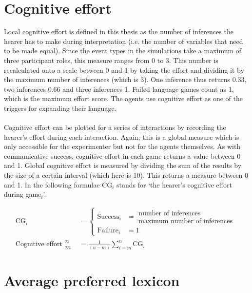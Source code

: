 \section*{Cognitive effort}

 Local cognitive effort is defined in this thesis as the number of inferences the hearer has to make during interpretation (i.e. the number of variables that need to be made equal). Since the event types in the simulations take a maximum of three participant roles, this measure ranges from 0 to 3. This number is recalculated onto a scale between 0 and 1 by taking the effort and dividing it by the maximum number of inferences (which is 3). One inference thus returns 0.33, two inferences 0.66 and three inferences 1. Failed language games count as 1, which is the maximum effort score. The agents use cognitive effort as one of the triggers for expanding their language.
\\
\\
 Cognitive effort can be plotted for a series of interactions by recording the hearer's effort during each interaction. Again, this is a global measure which is only accessible for the experimenter but not for the agents themselves. As with communicative success, cognitive effort in each game returns a value between 0 and 1. Global cognitive effort is measured by dividing the sum of the results by the size of a certain interval (which here is 10). This returns a measure between 0 and 1. In the following formulae CG$_i$ stands for `the hearer's cognitive effort during game$_i$'.

\begin{align*}
\text{CG}_i &= \left\{
\begin{array}{ll}
\text{Success}_i &= \begin{array}{cc}
\text{number of inferences} \\ \hline
\text{maximum number of inferences}
\end{array}
\\ 
\text{Failure}_i &= 1
\end{array} \right.
\\ \text{Cognitive effort}
\begin{array}{ll}
n \\
m
\end{array}
 &= \frac{1}{(n-m)} \sum_{i=m}^n \text{CG}_i
\end{align*}

\section*{Average preferred lexicon}
\label{a:lexicon}

